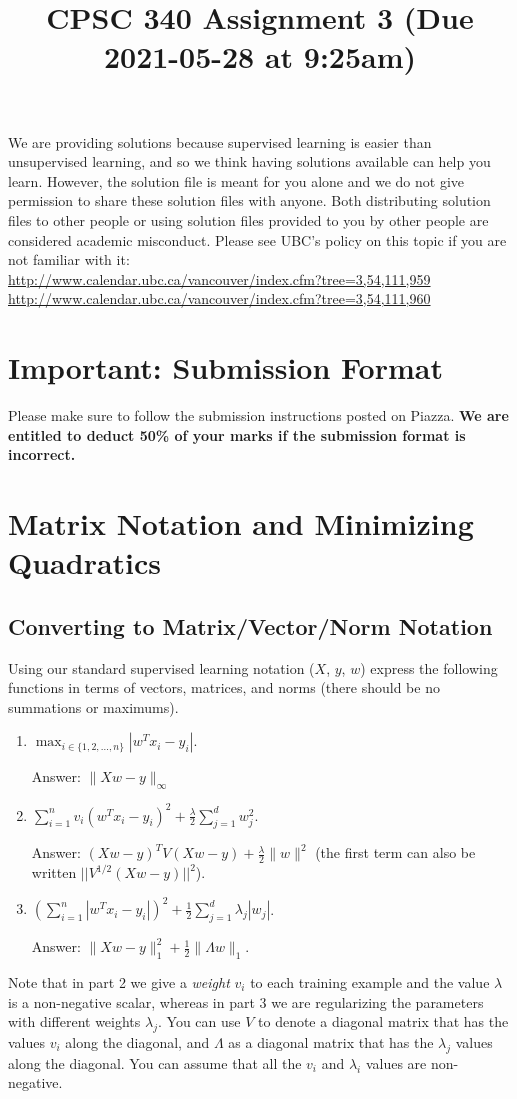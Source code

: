 \documentclass{article}
\def\ans#1{\par\gre{Answer: #1}}
\def\blu#1{{\color{blu}#1}}
\def\gre#1{{\color{gre}#1}}
\def\red#1{{\color{red}#1}}
\def\norm#1{\|#1\|}
\def\half{\frac 1 2}
\def\enum#1{\begin{enumerate}#1\end{enumerate}}
\begin{document}
\title{CPSC 340 Assignment 3 (Due 2021-05-28 at 9:25am)}
\date{}
\maketitle


\vspace{-4em}

\red{We are providing solutions because supervised learning is easier than unsupervised learning, and so we think having solutions available can help you learn. However, the solution file is meant for you alone and we do not give permission to share these solution files with anyone. Both distributing solution files to other people or using solution files provided to you by other people are considered academic misconduct. Please see UBC's policy on this topic if you are not familiar with it:\\
\url{http://www.calendar.ubc.ca/vancouver/index.cfm?tree=3,54,111,959}\\
\url{http://www.calendar.ubc.ca/vancouver/index.cfm?tree=3,54,111,960}}


\section*{Important: Submission Format}

Please make sure to follow the submission instructions posted on Piazza. \textbf{We are entitled to deduct 50\% of your marks if the submission format is incorrect.}

\section{Matrix Notation and Minimizing Quadratics}


\subsection{Converting to Matrix/Vector/Norm Notation}

Using our standard supervised learning notation ($X$, $y$, $w$)
express the following functions in terms of vectors, matrices, and norms (there should be no summations or maximums).
\blu{\enum{
\item $\max_{i \in \{1,2,\dots,n\}}  |w^Tx_i - y_i|$.
\ans{$\norm{Xw - y}_\infty$}
\item $\sum_{i=1}^n v_i(w^Tx_i  - y_i)^2 + \frac{\lambda}{2}\sum_{j=1}^d w_j^2$.
\ans{$(Xw - y)^TV(Xw-y) + \frac \lambda 2 \norm{w}^2$ (the first term can also be written $||V^{1/2}(Xw - y)||^2$).}
\item $\left(\sum_{i=1}^n |w^Tx_i - y_i|\right)^2 +  \half\sum_{j=1}^{d} \lambda_j|w_j|$.
\ans{$\norm{Xw - y}_1^2 + \half \norm{\Lambda w}_1$.}
}
}
Note that in part 2 we give a \emph{weight} $v_i$ to each training example \red{and the value $\lambda$ is a non-negative scalar}, whereas in part 3 we are regularizing the parameters with different weights $\lambda_j$.
You can use $V$ to denote a diagonal matrix that has the values $v_i$ along the diagonal, and $\Lambda$ as a diagonal matrix that has the $\lambda_j$ values along the diagonal. You can assume that all the $v_i$ and $\lambda_i$ values are non-negative. 
\end{document}

